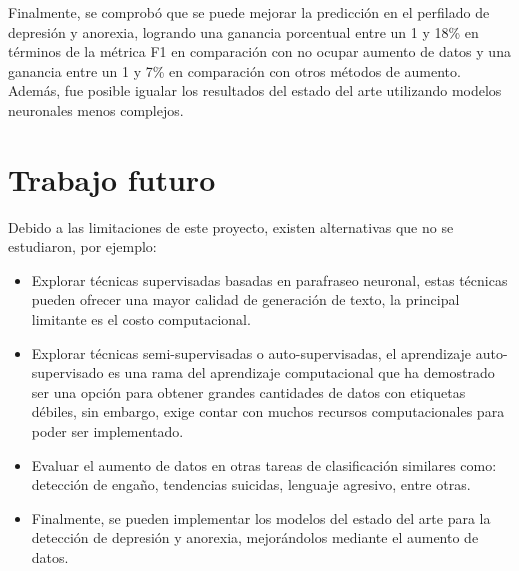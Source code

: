 Finalmente, se comprobó que se puede mejorar la predicción en el perfilado de depresión y anorexia, logrando una ganancia porcentual entre un 1 y 18\% en términos de la métrica F1 en comparación con no ocupar aumento de datos y una ganancia entre un 1 y 7\% en comparación con otros métodos de aumento. Además, fue posible igualar los resultados del estado del arte utilizando modelos neuronales menos complejos.


\section{Trabajo futuro}

Debido a las limitaciones de este proyecto, existen alternativas que no se estudiaron, por ejemplo:

\begin{itemize}
    \item Explorar técnicas supervisadas basadas en parafraseo neuronal, estas técnicas pueden ofrecer una mayor calidad de generación de texto, la principal limitante es el costo computacional.
    
    \item Explorar técnicas semi-supervisadas o auto-supervisadas, el aprendizaje auto-supervisado es una rama del aprendizaje computacional que ha demostrado ser una opción para obtener grandes cantidades de datos con etiquetas débiles, sin embargo, exige contar con muchos recursos computacionales para poder ser implementado.
    
    \item Evaluar el aumento de datos en otras tareas de clasificación similares como: detección de engaño, tendencias suicidas, lenguaje agresivo, entre otras.
    
    \item Finalmente, se pueden implementar los modelos del estado del arte para la detección de depresión y anorexia, mejorándolos mediante el aumento de datos.
    
    
\end{itemize}


